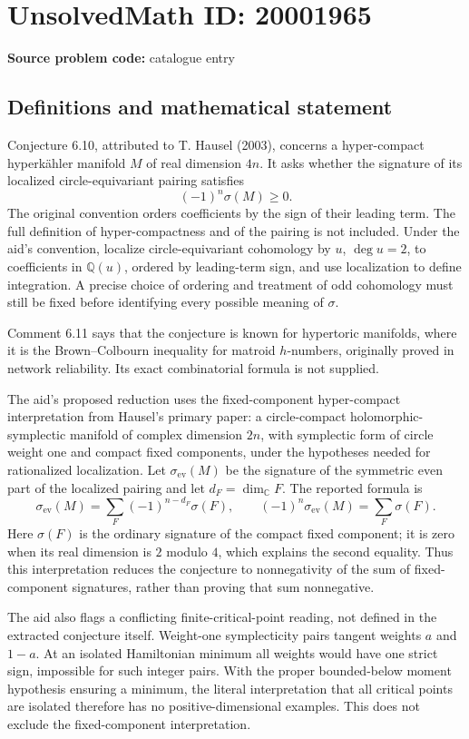 \documentclass[11pt]{article}
\begin{document}
\section*{UnsolvedMath ID: 20001965}
\textbf{Source problem code:} catalogue entry
\subsection{Definitions and mathematical statement}
Conjecture 6.10, attributed to T. Hausel (2003), concerns a hyper-compact hyperk\"ahler manifold \(M\) of real dimension \(4n\). It asks whether the signature of its localized circle-equivariant pairing satisfies
\[
 (-1)^n\sigma(M)\geq0.
\]
The original convention orders coefficients by the sign of their leading term. The full definition of hyper-compactness and of the pairing is not included. Under the aid's convention, localize circle-equivariant cohomology by \(u\), \(\deg u=2\), to coefficients in \(\mathbb Q(u)\), ordered by leading-term sign, and use localization to define integration. A precise choice of ordering and treatment of odd cohomology must still be fixed before identifying every possible meaning of \(\sigma\).

Comment 6.11 says that the conjecture is known for hypertoric manifolds, where it is the Brown--Colbourn inequality for matroid \(h\)-numbers, originally proved in network reliability. Its exact combinatorial formula is not supplied.

The aid's proposed reduction uses the fixed-component hyper-compact interpretation from Hausel's primary paper: a circle-compact holomorphic-symplectic manifold of complex dimension \(2n\), with symplectic form of circle weight one and compact fixed components, under the hypotheses needed for rationalized localization. Let \(\sigma_{\mathrm{ev}}(M)\) be the signature of the symmetric even part of the localized pairing and let \(d_F=\dim_{\mathbb C}F\). The reported formula is
\[
 \sigma_{\mathrm{ev}}(M)=\sum_F(-1)^{n-d_F}\sigma(F),\qquad
 (-1)^n\sigma_{\mathrm{ev}}(M)=\sum_F\sigma(F).
\]
Here \(\sigma(F)\) is the ordinary signature of the compact fixed component; it is zero when its real dimension is \(2\) modulo \(4\), which explains the second equality. Thus this interpretation reduces the conjecture to nonnegativity of the sum of fixed-component signatures, rather than proving that sum nonnegative.

The aid also flags a conflicting finite-critical-point reading, not defined in the extracted conjecture itself. Weight-one symplecticity pairs tangent weights \(a\) and \(1-a\). At an isolated Hamiltonian minimum all weights would have one strict sign, impossible for such integer pairs. With the proper bounded-below moment hypothesis ensuring a minimum, the literal interpretation that all critical points are isolated therefore has no positive-dimensional examples. This does not exclude the fixed-component interpretation.
\end{document}
